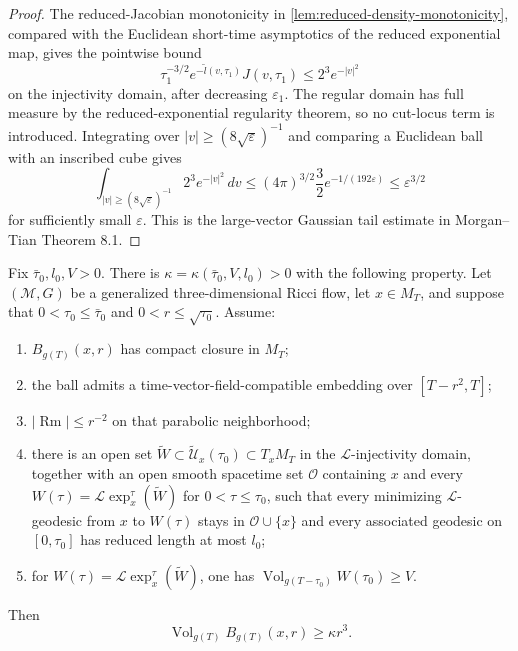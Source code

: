 \begin{proof}
The reduced-Jacobian monotonicity in
\ref{lem:reduced-density-monotonicity}, compared with the Euclidean
short-time asymptotics of the reduced exponential map, gives the pointwise
bound
\[
 \tau_1^{-3/2}e^{-\widetilde l(v,\tau_1)}J(v,\tau_1)
 \le 2^3 e^{-|v|^2}
\]
on the injectivity domain, after decreasing $\varepsilon_1$.  The regular
domain has full measure by the reduced-exponential regularity theorem, so no
cut-locus term is introduced.  Integrating over
$|v|\ge(8\sqrt\varepsilon)^{-1}$ and comparing a Euclidean ball with an
inscribed cube gives
\[
 \int_{|v|\ge(8\sqrt\varepsilon)^{-1}}2^3e^{-|v|^2}\,dv
 \le (4\pi)^{3/2}\frac32e^{-1/(192\varepsilon)}
 \le\varepsilon^{3/2}
\]
for sufficiently small $\varepsilon$.  This is the large-vector Gaussian
tail estimate in Morgan--Tian Theorem 8.1.
\end{proof}

\begin{theorem}
\label{thm:generalized-flow-noncollapsing-interface}
\notready
Fix $\bar\tau_0,l_0,V>0$.  There is
$\kappa=\kappa(\bar\tau_0,V,l_0)>0$ with the following property.  Let
$(\mathcal M,G)$ be a generalized three-dimensional Ricci flow, let
$x\in M_T$, and suppose that $0<\tau_0\le\bar\tau_0$ and
$0<r\le\sqrt{\tau_0}$.  Assume:
\begin{enumerate}
\item $B_{g(T)}(x,r)$ has compact closure in $M_T$;
\item the ball admits a time-vector-field-compatible embedding over
      $[T-r^2,T]$;
\item $|\operatorname{Rm}|\le r^{-2}$ on that parabolic neighborhood;
\item there is an open set
      $\widetilde W\subset\widetilde{\mathcal U}_x(\tau_0)\subset T_xM_T$
      in the $\mathcal L$-injectivity domain, together with an open smooth
      spacetime set $\mathcal O$ containing $x$ and every
      $W(\tau)=\mathcal L\exp_x^\tau(\widetilde W)$ for
      $0<\tau\le\tau_0$, such that every minimizing $\mathcal L$-geodesic
      from $x$ to $W(\tau)$ stays in $\mathcal O\cup\{x\}$ and every
      associated geodesic on $[0,\tau_0]$ has reduced length at most $l_0$;
\item for
      $W(\tau)=\mathcal L\exp_x^\tau(\widetilde W)$, one has
      $\operatorname{Vol}_{g(T-\tau_0)}W(\tau_0)\ge V$.
\end{enumerate}
Then
\[
 \operatorname{Vol}_{g(T)}B_{g(T)}(x,r)\ge\kappa r^3.
\]
\end{theorem}


